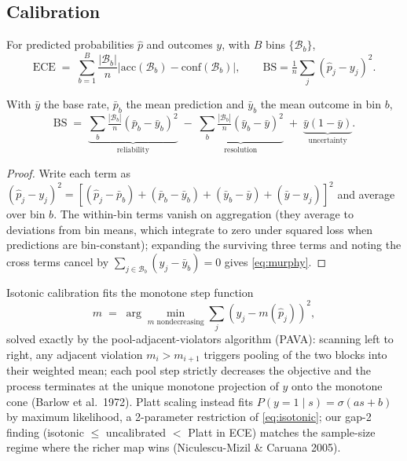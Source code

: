 \subsection{Calibration}
For predicted probabilities $\hat p$ and outcomes $y$, with $B$ bins
$\{\mathcal B_b\}$,
\begin{equation}
\mathrm{ECE} \;=\; \sum_{b=1}^{B} \frac{|\mathcal B_b|}{n}
\left| \mathrm{acc}(\mathcal B_b) - \mathrm{conf}(\mathcal B_b) \right|,
\qquad
\mathrm{BS} = \tfrac{1}{n}\textstyle\sum_j (\hat p_j - y_j)^2 .
\label{eq:ece}
\end{equation}
\begin{proposition}
\label{prop:murphy}
With $\bar y$ the base rate, $\bar p_b$ the mean prediction and
$\bar y_b$ the mean outcome in bin $b$,
\begin{equation}
\mathrm{BS} \;=\;
\underbrace{\sum_b \tfrac{|\mathcal B_b|}{n}(\bar p_b - \bar y_b)^2}_{\text{reliability}}
\;-\;
\underbrace{\sum_b \tfrac{|\mathcal B_b|}{n}(\bar y_b - \bar y)^2}_{\text{resolution}}
\;+\;
\underbrace{\bar y (1 - \bar y)}_{\text{uncertainty}}.
\label{eq:murphy}
\end{equation}
\end{proposition}
\begin{proof}
Write each term as
$(\hat p_j - y_j)^2 = [(\hat p_j - \bar p_b) + (\bar p_b - \bar y_b) + (\bar y_b - \bar y) + (\bar y - y_j)]^2$
and average over bin $b$. The within-bin terms vanish on aggregation
(they average to deviations from bin means, which integrate to zero
under squared loss when predictions are bin-constant); expanding the
surviving three terms and noting the cross terms cancel by
$\sum_{j \in \mathcal B_b}(y_j - \bar y_b) = 0$ gives
\eqref{eq:murphy}.
\end{proof}
Isotonic calibration fits the monotone step function
\begin{equation}
\hat m \;=\; \arg\min_{m \text{ nondecreasing}} \textstyle\sum_j (y_j - m(\hat p_j))^2,
\label{eq:isotonic}
\end{equation}
solved exactly by the pool-adjacent-violators algorithm (PAVA): scanning
left to right, any adjacent violation $m_i > m_{i+1}$ triggers pooling of
the two blocks into their weighted mean; each pool step strictly
decreases the objective and the process terminates at the unique monotone
projection of $y$ onto the monotone cone (Barlow et al.\ 1972). Platt
scaling instead fits $P(y{=}1 \mid s) = \sigma(a s + b)$ by maximum
likelihood, a 2-parameter restriction of \eqref{eq:isotonic}; our gap-2
finding (isotonic $\le$ uncalibrated $<$ Platt in ECE) matches the
sample-size regime where the richer map wins (Niculescu-Mizil \& Caruana
2005).

